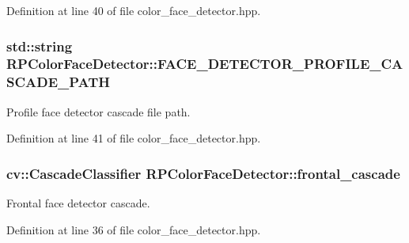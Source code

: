 \-Definition at line 40 of file color\-\_\-face\-\_\-detector.\-hpp.

\hypertarget{class_r_p_color_face_detector_a21186fee954aa109b73910875f60f7f0}{
\subsubsection[{\-F\-A\-C\-E\-\_\-\-D\-E\-T\-E\-C\-T\-O\-R\-\_\-\-P\-R\-O\-F\-I\-L\-E\-\_\-\-C\-A\-S\-C\-A\-D\-E\-\_\-\-P\-A\-T\-H}]{\setlength{\rightskip}{0pt plus 5cm}std\-::string {\bf \-R\-P\-Color\-Face\-Detector\-::\-F\-A\-C\-E\-\_\-\-D\-E\-T\-E\-C\-T\-O\-R\-\_\-\-P\-R\-O\-F\-I\-L\-E\-\_\-\-C\-A\-S\-C\-A\-D\-E\-\_\-\-P\-A\-T\-H}}}\label{class_r_p_color_face_detector_a21186fee954aa109b73910875f60f7f0}
\-Profile face detector cascade file path. 

\-Definition at line 41 of file color\-\_\-face\-\_\-detector.\-hpp.

\hypertarget{class_r_p_color_face_detector_a4ab7e99e6da2768d2005d573a43d1f30}{
\subsubsection[{frontal\-\_\-cascade}]{\setlength{\rightskip}{0pt plus 5cm}cv\-::\-Cascade\-Classifier {\bf \-R\-P\-Color\-Face\-Detector\-::frontal\-\_\-cascade}}}\label{class_r_p_color_face_detector_a4ab7e99e6da2768d2005d573a43d1f30}
\-Frontal face detector cascade. 

\-Definition at line 36 of file color\-\_\-face\-\_\-detector.\-hpp.

